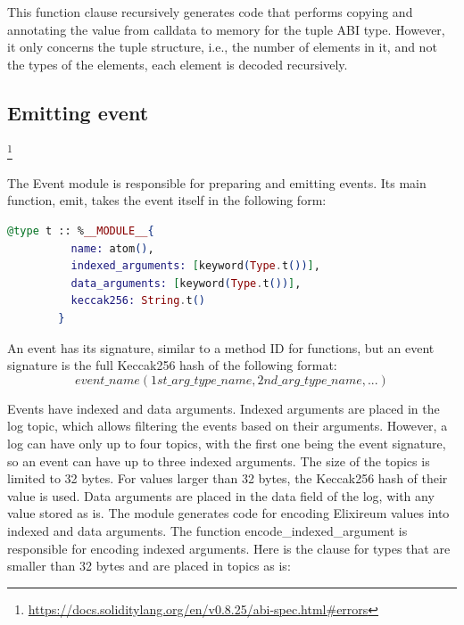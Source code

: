 This function clause recursively generates code that performs copying and annotating the value from calldata to memory for the tuple ABI type. However, it only concerns the tuple structure, i.e., the number of elements in it, and not the types of the elements, each element is decoded recursively.
  
\subsection{Emitting event}

\footnote{\url{https://docs.soliditylang.org/en/v0.8.25/abi-spec.html\#errors}}

The Event module is responsible for preparing and emitting events. Its main function, emit, takes the event itself in the following form:

\begin{lstlisting}[language=elixir, caption={Event structure}, label={lst:event_structure}]
  @type t :: %__MODULE__{
          name: atom(),
          indexed_arguments: [keyword(Type.t())],
          data_arguments: [keyword(Type.t())],
          keccak256: String.t()
        }
\end{lstlisting}
  
An event has its signature, similar to a method ID for functions, but an event signature is the full Keccak256 hash of the following format:
$$event\_name(1st\_arg\_type\_name,2nd\_arg\_type\_name,...)$$

Events have indexed and data arguments. Indexed arguments are placed in the log topic, which allows filtering the events based on their arguments. However, a log can have only up to four topics, with the first one being the event signature, so an event can have up to three indexed arguments. The size of the topics is limited to 32 bytes. For values larger than 32 bytes, the Keccak256 hash of their value is used. Data arguments are placed in the data field of the log, with any value stored as is. The module generates code for encoding Elixireum values into indexed and data arguments. The function encode\_indexed\_argument is responsible for encoding indexed arguments. Here is the clause for types that are smaller than 32 bytes and are placed in topics as is:

